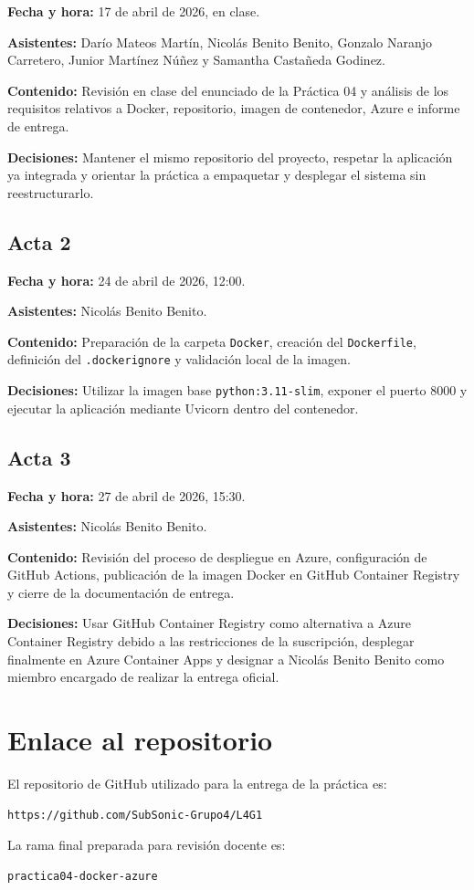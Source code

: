 \documentclass[11pt,a4paper]{article}
\begin{document}
\textbf{Fecha y hora:} 17 de abril de 2026, en clase.

\textbf{Asistentes:} Dar\'io Mateos Mart\'in, Nicol\'as Benito Benito, Gonzalo Naranjo Carretero, Junior Mart\'inez N\'u\~nez y Samantha Casta\~neda Godinez.

\textbf{Contenido:} Revisi\'on en clase del enunciado de la Pr\'actica 04 y an\'alisis de los requisitos relativos a Docker, repositorio, imagen de contenedor, Azure e informe de entrega.

\textbf{Decisiones:} Mantener el mismo repositorio del proyecto, respetar la aplicaci\'on ya integrada y orientar la pr\'actica a empaquetar y desplegar el sistema sin reestructurarlo.

\subsection*{Acta 2}

\textbf{Fecha y hora:} 24 de abril de 2026, 12:00.

\textbf{Asistentes:} Nicol\'as Benito Benito.

\textbf{Contenido:} Preparaci\'on de la carpeta \texttt{Docker}, creaci\'on del \texttt{Dockerfile}, definici\'on del \texttt{.dockerignore} y validaci\'on local de la imagen.

\textbf{Decisiones:} Utilizar la imagen base \texttt{python:3.11-slim}, exponer el puerto 8000 y ejecutar la aplicaci\'on mediante Uvicorn dentro del contenedor.

\subsection*{Acta 3}

\textbf{Fecha y hora:} 27 de abril de 2026, 15:30.

\textbf{Asistentes:} Nicol\'as Benito Benito.

\textbf{Contenido:} Revisi\'on del proceso de despliegue en Azure, configuraci\'on de GitHub Actions, publicaci\'on de la imagen Docker en GitHub Container Registry y cierre de la documentaci\'on de entrega.

\textbf{Decisiones:} Usar GitHub Container Registry como alternativa a Azure Container Registry debido a las restricciones de la suscripci\'on, desplegar finalmente en Azure Container Apps y designar a Nicol\'as Benito Benito como miembro encargado de realizar la entrega oficial.

\section{Enlace al repositorio}

El repositorio de GitHub utilizado para la entrega de la pr\'actica es:

\begin{verbatim}
https://github.com/SubSonic-Grupo4/L4G1
\end{verbatim}

La rama final preparada para revisi\'on docente es:

\begin{verbatim}
practica04-docker-azure
\end{verbatim}
\end{document}

